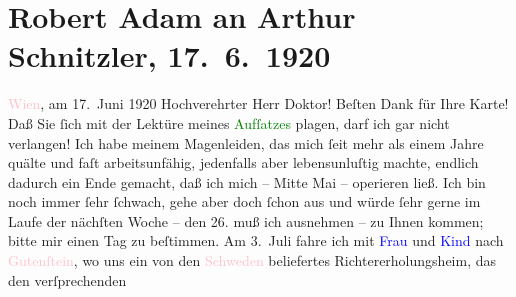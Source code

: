 

               \section[Robert Adam an Arthur Schnitzler, 17. 6. 1920]{ Robert Adam an Arthur Schnitzler, 17. 6. 1920}\nopagebreak{}\rehead{ }\normalsize\beginnumbering{} \toendnotes[C]{\smallbreak\pagebreak[2]} 
\toendnotes[C]{\smallbreak}\pstart
           \raggedleft{}{\pb}\textcolor{pink}{Wien}{}\ledrightnote{\textcolor{pink}{Wien}}, am 17. Juni 1920\pend
           \pstart\center{}Hochverehrter Herr Doktor!\pend\pstart
           Beſten Dank für Ihre Karte! Daß Sie ſich mit der Lektüre meines \textcolor{green}{Aufſatzes}{} plagen, darf ich gar nicht
                    verlangen!\pend
           \pstart
           Ich habe meinem Magenleiden, das mich ſeit mehr als einem Jahre quälte und faſt
                    arbeitsunfähig, jedenfalls aber lebensunluſtig machte, endlich dadurch ein Ende
                    gemacht, daß ich mich – Mitte Mai – operieren ließ. Ich bin noch
                    immer ſehr ſchwach, gehe aber doch ſchon aus und würde ſehr gerne {\pb}im Laufe der nächſten Woche – den
                        26. muß ich ausnehmen – zu Ihnen kommen; bitte mir einen Tag zu
                    beſtimmen.\pend
           \pstart
           Am 3. Juli fahre ich mit \textcolor{blue}{Frau}{} und \textcolor{blue}{Kind}{} nach \textcolor{pink}{Gutenſtein}{}\ledrightnote{\textcolor{pink}{Gutenstein}}, wo uns ein von den \textcolor{pink}{Schweden}{}\ledrightnote{\textcolor{pink}{Schweden}} beliefertes Richtererholungsheim, das den verſprechenden
